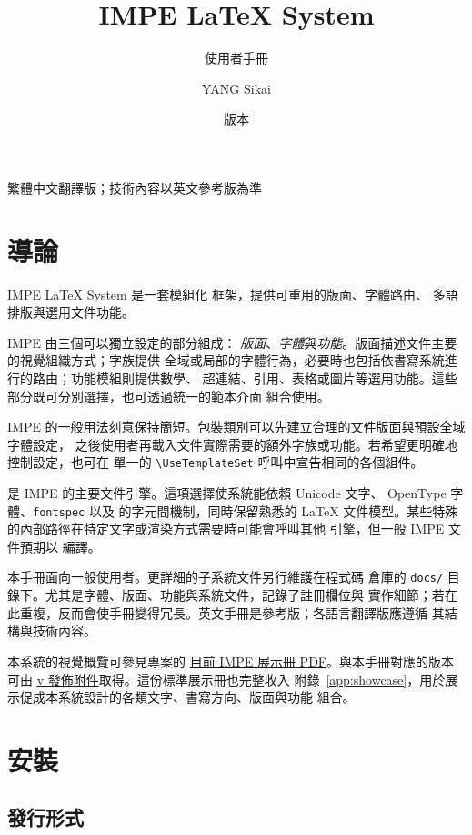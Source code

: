 \documentclass[11pt,lang=zh]{impeart}
\title{IMPE \LaTeX{} System}
\subtitle{使用者手冊}
\author{YANG Sikai}
\date{版本 \IMPEVersion}
\newcommand{\IMPEShowcaseURL}{https://github.com/KelvinYangBK67/IMPE-LaTeX-System/blob/main/manual/showcase/impe-showcase.pdf}
\newcommand{\IMPETaggedShowcaseURL}{https://github.com/KelvinYangBK67/IMPE-LaTeX-System/releases/download/v\IMPEVersion/impe-showcase-\IMPEVersion.pdf}
\begin{document}
\maketitle

\begin{center}
\small 繁體中文翻譯版；技術內容以英文參考版為準
\end{center}

\tableofcontents

\section{導論}

IMPE \LaTeX{} System 是一套模組化 \XeLaTeX{} 框架，提供可重用的版面、字體路由、
多語排版與選用文件功能。

IMPE 由三個可以獨立設定的部分組成：
\emph{版面}、\emph{字體}與\emph{功能}。版面描述文件主要的視覺組織方式；字族提供
全域或局部的字體行為，必要時也包括依書寫系統進行的路由；功能模組則提供數學、
超連結、引用、表格或圖片等選用功能。這些部分既可分別選擇，也可透過統一的範本介面
組合使用。

IMPE 的一般用法刻意保持簡短。包裝類別可以先建立合理的文件版面與預設全域字體設定，
之後使用者再載入文件實際需要的額外字族或功能。若希望更明確地控制設定，也可在
單一的 \verb|\UseTemplateSet| 呼叫中宣告相同的各個組件。

\XeLaTeX{} 是 IMPE 的主要文件引擎。這項選擇使系統能依賴 Unicode 文字、
OpenType 字體、\texttt{fontspec} 以及 \XeTeX{} 的字元間機制，同時保留熟悉的
\LaTeX{} 文件模型。某些特殊的內部路徑在特定文字或渲染方式需要時可能會呼叫其他
引擎，但一般 IMPE 文件預期以 \XeLaTeX{} 編譯。

本手冊面向一般使用者。更詳細的子系統文件另行維護在程式碼
倉庫的 \texttt{docs/} 目錄下。尤其是字體、版面、功能與系統文件，記錄了註冊欄位與
實作細節；若在此重複，反而會使手冊變得冗長。英文手冊是參考版；各語言翻譯版應遵循
其結構與技術內容。

本系統的視覺概覽可參見專案的
\href{\IMPEShowcaseURL}{目前 IMPE 展示冊 PDF}。與本手冊對應的版本可由
\href{\IMPETaggedShowcaseURL}{v\IMPEVersion{} 發佈附件}取得。這份標準展示冊也完整收入
附錄~\ref{app:showcase}，用於展示促成本系統設計的各類文字、書寫方向、版面與功能
組合。

\section{安裝}

\subsection{發行形式}
\end{document}
